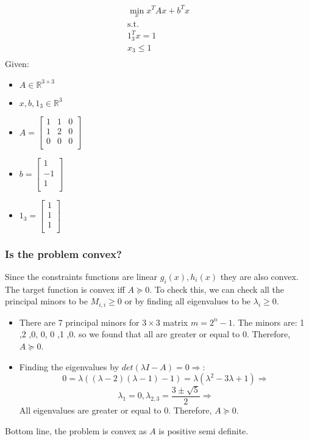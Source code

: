 \documentclass[12pt]{article}
\begin{document}
\begin{equation}
\label{eq:min3}
\begin{split}
    \min _x x^T A x + b^T x \\
    \text{s.t. } \\
    1^T_3x = 1\\
    x_3 \leq 1\\
\end{split}
\end{equation}
Given:
\begin{itemize}
  \item $A \in \mathbb{R}^{3 \times 3}$
  \item $x,b,1_3 \in \mathbb{R}^{3}$
  \item $A = \begin{bmatrix}
               1 & 1 & 0 \\
                1 & 2 & 0 \\
                0 & 0 & 0 \\
              \end{bmatrix}$
  \item $b = \begin{bmatrix}  1 \\ -1 \\ 1\\ \end{bmatrix}$
  \item $1_3 = \begin{bmatrix} 1\\  1\\  1\\ \end{bmatrix}$
\end{itemize}

\subsubsection{Is the problem convex?}
Since the constraints functions are linear $g_i(x),h_i(x)$ they are also convex.\\
The target function is convex iff $A\succcurlyeq 0$.
To check this, we can check all the principal minors to be $M_{i,i}\geq 0$ or by finding all eigenvalues to be $\lambda_i \geq 0$. 
\begin{itemize}
  \item There are 7 principal minors for $3\times3$ matrix $m=2^n-1$. The minors are: 1 ,2 ,0, 0, 0 ,1 ,0. so we found that all are greater or equal to 0. Therefore, $A\succcurlyeq 0$.
  \item Finding the eigenvalues by $det(\lambda I - A) = 0 \Rightarrow$:\\
  $$0=\lambda((\lambda-2)(\lambda-1)-1)=\lambda(\lambda^2-3\lambda+1)\Rightarrow$$
  $$\lambda_1=0, \lambda_{2,3}=\frac{3\pm \sqrt{5}}{2} \Rightarrow$$
  All eigenvalues are greater or equal to 0. Therefore, $A\succcurlyeq 0$.
\end{itemize}
Bottom line, the problem is convex as $A$ is positive semi definite. 
\end{document}
